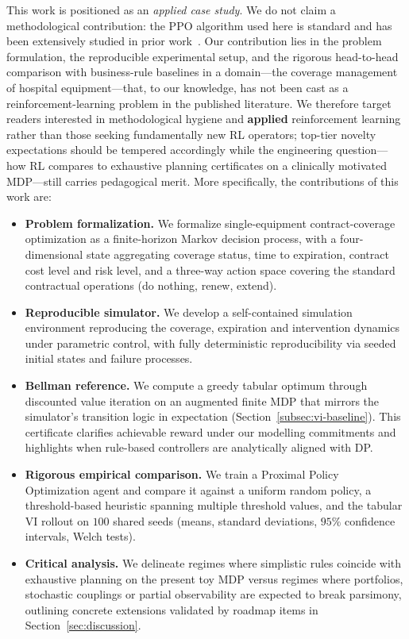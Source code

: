 This work is positioned as an \emph{applied case study}. We do not claim
a methodological contribution: the PPO algorithm used here is standard
and has been extensively studied in prior work~\cite{schulman2017ppo,
andrychowicz2021matters}. Our contribution lies in the problem
formulation, the reproducible experimental setup, and the rigorous
head-to-head comparison with business-rule baselines in a domain---the
coverage management of hospital equipment---that, to our knowledge, has
not been cast as a reinforcement-learning problem in the published
literature. We therefore target readers interested in methodological hygiene and
\textbf{applied} reinforcement learning rather than those seeking fundamentally new RL
operators; top-tier novelty expectations should be tempered accordingly while the
engineering question---how RL compares to exhaustive planning certificates on a clinically
motivated MDP---still carries pedagogical merit. More specifically, the contributions of this work are:
\begin{itemize}
    \item \textbf{Problem formalization.} We formalize single-equipment
          contract-coverage optimization as a finite-horizon Markov
          decision process, with a four-dimensional state aggregating
          coverage status, time to expiration, contract cost level and
          risk level, and a three-way action space covering the standard
          contractual operations (do nothing, renew, extend).
    \item \textbf{Reproducible simulator.} We develop a self-contained
          simulation environment reproducing the coverage, expiration
          and intervention dynamics under parametric control, with fully
          deterministic reproducibility via seeded initial states and
          failure processes.
    \item \textbf{Bellman reference.} We compute a greedy tabular optimum through
          discounted value iteration on an augmented finite MDP that mirrors the
          simulator's transition logic in expectation (Section~\ref{subsec:vi-baseline}).
          This certificate clarifies achievable reward under our modelling commitments
          and highlights when rule-based controllers are analytically aligned with DP.
    \item \textbf{Rigorous empirical comparison.} We train a Proximal
          Policy Optimization agent and compare it against a uniform random policy,
          a threshold-based heuristic spanning multiple threshold values, and the
          tabular VI rollout on $100$ shared seeds (means, standard deviations,
          $95\%$ confidence intervals, Welch tests).
    \item \textbf{Critical analysis.} We delineate regimes where simplistic rules
          coincide with exhaustive planning on the present toy MDP versus regimes where
          portfolios, stochastic couplings or partial observability are expected to
          break parsimony, outlining concrete extensions validated by roadmap items in
          Section~\ref{sec:discussion}.
\end{itemize}

